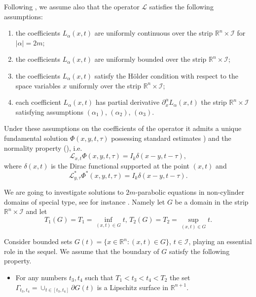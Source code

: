 \documentclass{amsart}
\theoremstyle{definition}
\theoremstyle{remark}
\numberwithin{equation}{section}
\begin{document}
Following \cite[pp. 245-246]{eid}, we assume also that the operator $\mathcal L$ satisfies 
the following assumptions:
\begin{enumerate}
\item[($\alpha_1$)] 
the coefficients $L_\alpha(x,t)$ are uniformly continuous over the strip 
${\mathbb R}^{n} \times \mathcal{I}$ for $|\alpha|=2m$; 
\item[($\alpha_2$)] 
the coefficients $L_\alpha(x,t)$ are uniformly bounded over the strip 
${\mathbb R}^{n} \times \mathcal{I}$; 
\item[($\alpha_3$)] 
the coefficients $L_\alpha(x,t)$ satisfy the H\"older condition  with respect to the space 
variables $x$ uniformly over the strip ${\mathbb R}^{n} \times \mathcal{I}$; 
\item[($\alpha_4$)]
each coefficient $L_\alpha(x,t)$ has partial derivative $\partial^\alpha _x L_\alpha(x,t)$ 
the strip ${\mathbb R}^{n} \times \mathcal{I}$ satisfying assumptions $(\alpha_1)$, 
$(\alpha_2)$, $(\alpha_3)$.
\end{enumerate}
Under these assumptions on  the coefficients of the operator it admits a unique fundamental 
solution  $\Phi (x,y,t,\tau)$ possessing standard estimates \cite[formulas (2.16), 
(2.17)]{eid}) and the normality property (\cite[Property 2.2]{eid}), i.e. 
\begin{equation} \label{eq.right}
{\mathcal L}_{x,t} \Phi(x,y,t,\tau) = I_k \delta (x-y, t-\tau),   
\end{equation}
where $\delta (x, t)$ is the Dirac functional supported at the point $(x,t)$ and  
\begin{equation} \label{eq.left}
{\mathcal L}^*_{y,\tau} \Phi^*(x,y,t,\tau)  =I_k \delta (x-y, t-\tau). 
\end{equation}

We are going to investigate solutions to $2m$-parabolic equations in  non-cylinder domains 
of special type, see for instance \cite[\S 22]{sol}. Namely let  $G$ be a  
domain in the strip ${\mathbb R}^{n} \times  \mathcal{I}$ and let 
$$
T_1(G)=T_1=\inf_{(x,t)\in G} t, \, T_2(G) = T_2=\sup_{(x,t)\in G} t. 
$$

Consider bounded sets $G (t) = \{x \in {\mathbb R}^n: (x,t) \in G\}$, $t\in 
\mathcal{I}$, playing an essential role in the sequel. We assume that the boundary 
of $G$ satisfy the following property.

\begin{itemize}
\item[(A)] 
For any numbers $t_3, t_4$ such that $T_1<t_3<t_4<T_2$ 
the set $\Gamma _{t_3,t_4}=\cup_{t\in [t_3,t_4]} \partial G (t)$ is a Lipschitz surface 
in ${\mathbb R}^{n+1}$. %
\end{itemize}
\end{document}
